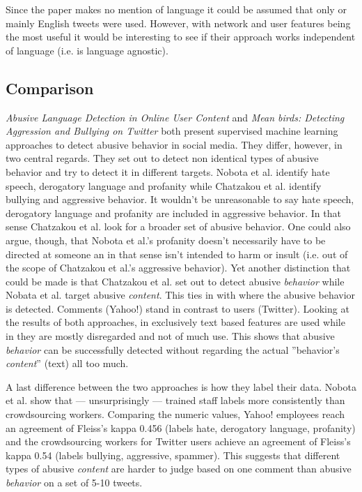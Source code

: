 \documentclass{proseminar}
\begin{document}
Since the paper makes no mention of language it could be assumed that only or mainly English tweets were used. However, with network and user features being the most useful it would be interesting to see if their approach works independent of language (i.e. is language agnostic).

\subsection{Comparison}
\emph{Abusive Language Detection in Online User Content} and \emph{Mean birds: Detecting Aggression and Bullying on Twitter} both present supervised machine learning approaches to detect abusive behavior in social media. They differ, however, in two central regards. They set out to detect non identical types of abusive behavior and try to detect it in different targets. Nobota et al. identify hate speech, derogatory language and profanity while Chatzakou et al. identify bullying and aggressive behavior. It wouldn't be unreasonable to say hate speech, derogatory language and profanity are included in aggressive behavior. In that sense Chatzakou et al. look for a broader set of abusive behavior. One could also argue, though, that Nobota et al.'s profanity doesn't necessarily have to be directed at someone an in that sense isn't intended to harm or insult (i.e. out of the scope of Chatzakou et al.'s aggressive behavior). Yet another distinction that could be made is that Chatzakou et al. set out to detect abusive \emph{behavior} while Nobata et al. target abusive \emph{content}. This ties in with where the abusive behavior is detected. Comments (Yahoo!) stand in contrast to users (Twitter). Looking at the results of both approaches, in \cite{Yahoo:2016} exclusively text based features are used while in \cite{Twitter:2017} they are mostly disregarded and not of much use. This shows that abusive \emph{behavior} can be successfully detected without regarding the actual ''behavior's \emph{content}'' (text) all too much.

A last difference between the two approaches is how they label their data. Nobota et al. show that --- unsurprisingly --- trained staff labels more consistently than crowdsourcing workers. Comparing the numeric values, Yahoo! employees reach an agreement of Fleiss's kappa 0.456 (labels hate, derogatory language, profanity) and the crowdsourcing workers for Twitter users achieve an agreement of Fleiss's kappa 0.54 (labels bullying, aggressive, spammer). This suggests that different types of abusive \emph{content} are harder to judge based on one comment than abusive \emph{behavior} on a set of 5-10 tweets.
\end{document}
